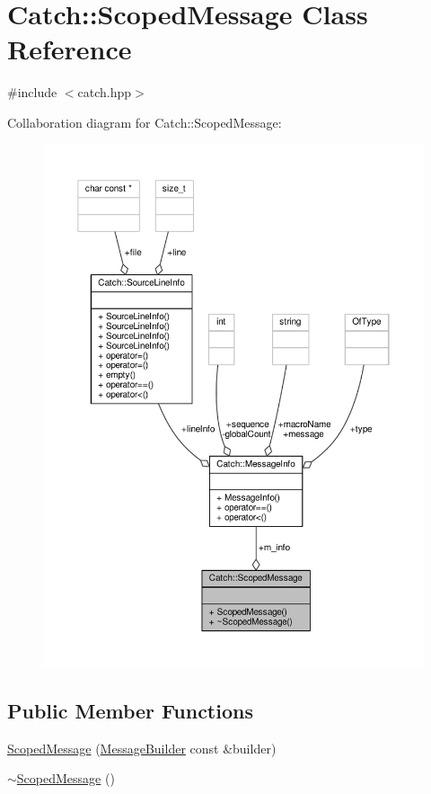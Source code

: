 \hypertarget{class_catch_1_1_scoped_message}{\section{Catch\-:\-:Scoped\-Message Class Reference}
\label{class_catch_1_1_scoped_message}
}


{\ttfamily \#include $<$catch.\-hpp$>$}



Collaboration diagram for Catch\-:\-:Scoped\-Message\-:
\nopagebreak
\begin{figure}[H]
\begin{center}
\leavevmode
\includegraphics[width=350pt]{class_catch_1_1_scoped_message__coll__graph}
\end{center}
\end{figure}
\subsection*{Public Member Functions}
\begin{DoxyCompactItemize}
\item 
\hyperlink{class_catch_1_1_scoped_message_a5cc59f0f2ebe840e6607f83004d49a17}{Scoped\-Message} (\hyperlink{struct_catch_1_1_message_builder}{Message\-Builder} const \&builder)
\item 
\hyperlink{class_catch_1_1_scoped_message_a43190843f9eeb84a0b42b0bc95fdf93a}{$\sim$\-Scoped\-Message} ()
\end{DoxyCompactItemize}
